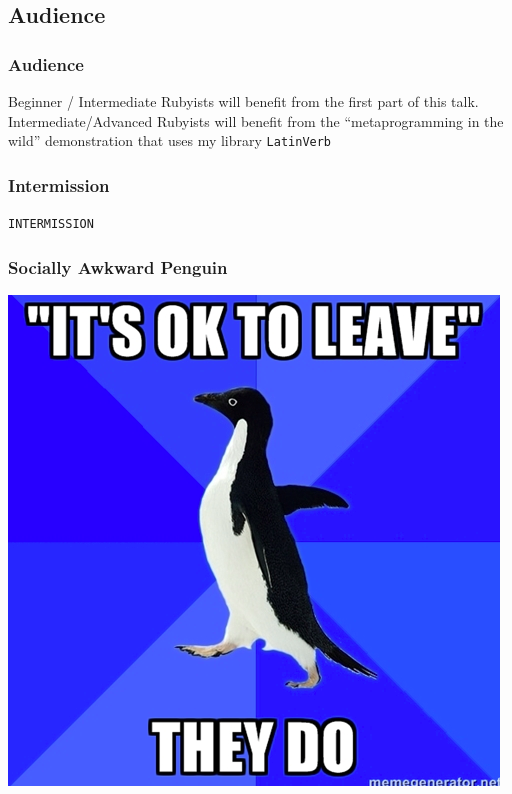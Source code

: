 \documentclass[slidestop,compress,mathserif]{beamer}
\begin{document}

\subsection{Audience} %
\label{sub:audience}
\begin{frame}
	\frametitle{Audience}
	Beginner / Intermediate Rubyists will benefit from the first part of this talk.
	\vskip 2.0cm
	Intermediate/Advanced Rubyists will benefit from the ``metaprogramming in the wild'' demonstration that uses my library \texttt{LatinVerb}
\end{frame}

\begin{frame}
	\frametitle{Intermission}
	\begin{center}
		\texttt{INTERMISSION}
	\end{center}
\end{frame}

\begin{frame}
	\frametitle{Socially Awkward Penguin}
	\begin{center}
		\includegraphics[scale=0.3]{img/sap.png}
	\end{center}
\end{frame}
\end{document}
